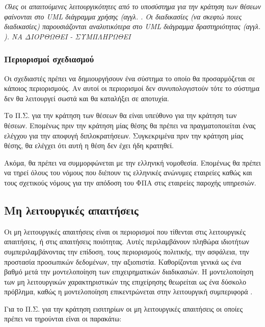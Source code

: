 \documentclass{assignment}
\begin{document}
\emph{ Όλες οι απαιτούμενες λειτουργικότητες από το υποσύστημα για την κράτηση των θέσεων φαίνονται στο UML διάγραμμα χρήσης (αγγλ. . Οι διαδικασίες (να σκεφτώ ποιες διαδικασίες) παρουσιάζονται αναλυτικότερα στο UML διάγραμμα δραστηριότητας (αγγλ. ). NA ΔΙΟΡΘΩΘΕΙ - ΣΥΜΠΛΗΡΩΘΕΙ}

\subsubsection{Περιορισμοί σχεδιασμού}

Οι σχεδιαστές πρέπει να δημιουργήσουν ένα σύστημα το οποίο θα προσαρμόζεται σε κάποιος περιορισμούς. Αν αυτοί οι περιορισμοί δεν συνυπολογιστούν τότε το σύστημα δεν θα λειτουργεί σωστά και θα καταλήξει σε αποτυχία. 

Το Π.Σ. για την κράτηση των θέσεων θα είναι υπεύθυνο για την κράτηση των θέσεων. Επομένως πριν την κράτηση μίας θέσης θα πρέπει να πραγματοποιείται ένας ελέγχου για την αποφυγή διπλοκρατήσεων. Συγκεκριμένα πριν την κράτηση μίας θέσης, θα ελέγχει ότι αυτή η θέση δεν έχει ήδη κρατηθεί.

Ακόμα, θα πρέπει να συμμορφώνεται με την ελληνική νομοθεσία. Επομένως θα πρέπει να τηρεί όλους του νόμους που διέπουν τις ελληνικές ανώνυμες εταιρείες καθώς και τους σχετικούς νόμους για την απόδοση του ΦΠΑ στις εταιρείες παροχής υπηρεσιών.

\subsection{Μη λειτουργικές απαιτήσεις}

Οι μη λειτουργικές απαιτήσεις είναι οι περιορισμοί που τίθενται στις λειτουργικές απαιτήσεις, ή στις απαιτήσεις ποιότητας. Αυτές περιλαμβάνουν πληθώρα ιδιοτήτων συμπεριλαμβάνοντας την επίδοση, τους περιορισμούς πολιτικής, την ασφάλεια, την προστασία προσωπικών δεδομένων, την αξιοπιστία. Καθορίζονται γενικά ως ένα βαθμό μετά την μοντελοποίηση των επιχειρηματικών διαδικασιών. Η μοντελοποίηση των μη λειτουργικών χαρακτηριστικών της επιχείρησης θεωρείται ως ένα δύσκολο πρόβλημα, καθώς η μοντελοποίηση επικεντρώνεται στην λειτουργική συμπεριφορά \cite{triadis}.

Για το Π.Σ. για την κράτηση εισιτηρίων οι μη λειτουργικές απαιτήσεις οι οποίες πρέπει να τηρούνται είναι οι παρακάτω:
\end{document}
